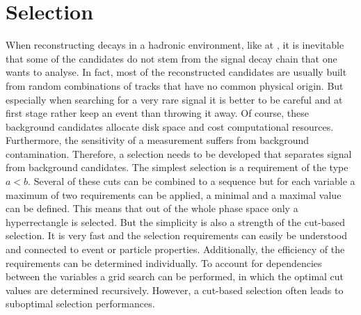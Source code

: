
\section{Selection}
\label{sec:dataanalysis:selection}

When reconstructing decays in a hadronic environment, like at \lhcb, it is
inevitable that some of the candidates do not stem from the signal decay chain
that one wants to analyse. In fact, most of the reconstructed candidates are
usually built from random combinations of tracks that have no common physical
origin. But especially when searching for a very rare signal it is better to
be careful and at first stage rather keep an event than throwing it away. Of
course, these background candidates allocate disk space and cost computational
resources. Furthermore, the sensitivity of a measurement suffers from
background contamination. Therefore, a selection needs to be developed that
separates signal from background candidates. The simplest selection is a
requirement of the type $a < b$. Several of these cuts can be combined to a
sequence but for each variable a maximum of two requirements can be applied,
\ie a minimal and a maximal value can be defined. This means that out of the
whole phase space only a hyperrectangle is selected. But the simplicity is
also a strength of the cut-based selection. It is very fast and the selection
requirements can easily be understood and connected to event or particle
properties. Additionally, the efficiency of the requirements can be determined
individually. To account for dependencies between the variables a grid search
can be performed, in which the optimal cut values are determined recursively.
However, a cut-based selection often leads to suboptimal selection
performances.
